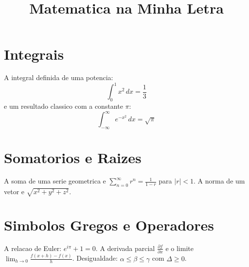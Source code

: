 \documentclass{article}
\title{Matematica na Minha Letra}
\begin{document}
\maketitle

\section{Integrais}
A integral definida de uma potencia:
\[ \int_0^1 x^2 \, dx = \frac{1}{3} \]
e um resultado classico com a constante $\pi$:
\[ \int_{-\infty}^{\infty} e^{-x^2} \, dx = \sqrt{\pi} \]

\section{Somatorios e Raizes}
A soma de uma serie geometrica e $\sum_{n=0}^{\infty} r^n = \frac{1}{1-r}$
para $|r| < 1$. A norma de um vetor e $\sqrt{x^2 + y^2 + z^2}$.

\section{Simbolos Gregos e Operadores}
A relacao de Euler: $e^{i\pi} + 1 = 0$. A derivada parcial
$\frac{\partial f}{\partial x}$ e o limite $\lim_{h \to 0} \frac{f(x+h)-f(x)}{h}$.
Desigualdade: $\alpha \leq \beta \leq \gamma$ com $\Delta \geq 0$.
\end{document}
